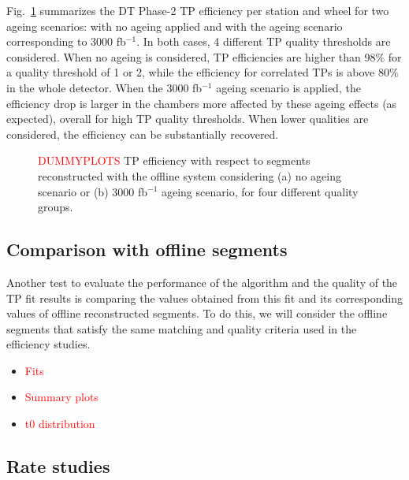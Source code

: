 \documentclass[../main.tex]{subfiles}
\begin{document}
Fig.~\ref{dts:fig:efficiency} summarizes the DT Phase-2 TP efficiency per station and wheel for two ageing scenarios: with no ageing applied and with the ageing scenario corresponding to 3000 fb${}^{-1}$. In both cases, 4 different TP quality thresholds are considered. When no ageing is considered, TP efficiencies are higher than 98$\%$ for a quality threshold of 1 or 2, while the efficiency for correlated TPs is above 80$\%$ in the whole detector. When the 3000 fb${}^{-1}$ ageing scenario is applied, the efficiency drop is larger in the chambers more affected by these ageing effects (as expected), overall for high TP quality thresholds. When lower qualities are considered, the efficiency can be substantially recovered.


\begin{figure}[h!]

\begin{center}
\end{center}
\caption{\textcolor{red}{DUMMYPLOTS} TP efficiency with respect to segments reconstructed with the offline system considering (a) no ageing scenario or (b) 3000 fb${}^{-1}$ ageing scenario, for four different quality groups.}
\label{dts:fig:efficiency}
\end{figure}


\subsection{Comparison with offline segments}

Another test to evaluate the performance of the algorithm and the quality of the TP fit results is comparing the values obtained from this fit and its corresponding values of offline reconstructed segments. To do this, we will consider the offline segments that satisfy the same matching and quality criteria used in the efficiency studies.

\begin{itemize}
	\item \textcolor{red}{Fits}
	\item \textcolor{red}{Summary plots}
	\item \textcolor{red}{t0 distribution}
\end{itemize}


\subsection{Rate studies}
\end{document}

